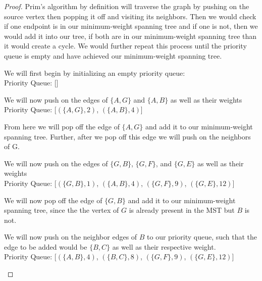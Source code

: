 \documentclass[11pt]{article}
\theoremstyle{definition}
\theoremstyle{definition}
\theoremstyle{definition}
\begin{document}
\begin{proof}
Prim's algorithm by definition will traverse the graph by pushing on the source vertex then popping it off and visiting its neighbors. Then we would check if one endpoint is in our minimum-weight spanning tree and if one is not, then we would add it into our tree, if both are in our minimum-weight spanning tree than it would create a cycle. We would further repeat this process until the priority queue is empty and have achieved our minimum-weight spanning tree. \\

\begin{center}
We will first begin by initializing an empty priority queue: \\
Priority Queue: [] \\
\end{center}

\begin{center}
We will now push on the edges of $\{A, G\}$ and $\{A, B\}$ as well as their weights\\
Priority Queue: [$(\{A, G\},2)$, $(\{A, B\},4)$] \\
\end{center}

\begin{center}
From here we will pop off the edge of $\{A, G\}$ and add it to our minimum-weight spanning tree. Further, after we pop off this edge we will push on the neighbors of G.\\
\end{center}

\begin{center}
We will now push on the edges of $\{G, B\}$, $\{G, F\}$, and $\{G, E\}$ as well as their weights\\
Priority Queue: [$(\{G, B\},1)$, $(\{A, B\},4)$, $(\{G, F\},9)$, $(\{G, E\},12)$] \\
\end{center}

\begin{center}
We will now pop off the edge of $\{G, B\}$ and add it to our minimum-weight spanning tree, since the the vertex of $G$ is already present in the MST but $B$ is not.
\end{center}

\begin{center}
We will now push on the neighbor edges of $B$ to our priority queue, such that the edge to be added would be $\{B, C\}$ as well as their respective weight. \\
Priority Queue: [$(\{A, B\},4)$, $(\{B, C\},8)$, $(\{G, F\},9)$, $(\{G, E\},12)$] \\
\end{center}


\end{proof}
\end{document}
